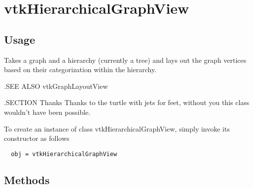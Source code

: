 \section{vtkHierarchicalGraphView}

\subsection{Usage}

 Takes a graph and a hierarchy (currently a tree) and lays out the graph 
 vertices based on their categorization within the hierarchy.

 .SEE ALSO
 vtkGraphLayoutView

 .SECTION Thanks
 Thanks to the turtle with jets for feet, without you this class wouldn't 
 have been possible.

To create an instance of class vtkHierarchicalGraphView, simply
invoke its constructor as follows
\begin{verbatim}
  obj = vtkHierarchicalGraphView
\end{verbatim}
\subsection{Methods}


